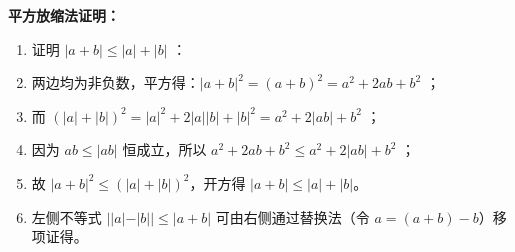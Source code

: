 \begin{proofbox}
\textbf{平方放缩法证明：}
\begin{enumerate}
    \item 证明 $|a+b| \leqslant |a| + |b|$ ：
    \item 两边均为非负数，平方得：$|a+b|^2 = (a+b)^2 = a^2 + 2ab + b^2$ ；
    \item 而 $(|a| + |b|)^2 = |a|^2 + 2|a||b| + |b|^2 = a^2 + 2|ab| + b^2$ ；
    \item 因为 $ab \leqslant |ab|$ 恒成立，所以 $a^2 + 2ab + b^2 \leqslant a^2 + 2|ab| + b^2$ ；
    \item 故 $|a+b|^2 \leqslant (|a| + |b|)^2$，开方得 $|a+b| \leqslant |a| + |b|$。
    \item 左侧不等式 $||a| - |b|| \leqslant |a+b|$ 可由右侧通过替换法（令 $a = (a+b) - b$）移项证得。
\end{enumerate}
\end{proofbox}